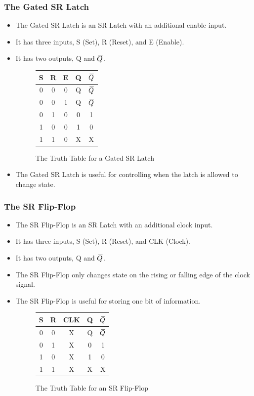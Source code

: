 \documentclass[12pt]{article}
\newcommand{\closure}[2][3]{%
	{}\mkern#1mu\overline{\mkern-#1mu#2}}
\begin{document}
\subsubsection{The Gated SR Latch}
\begin{itemize}
	\item The Gated SR Latch is an SR Latch with an additional enable input.
	\item It has three inputs, S (Set), R (Reset), and E (Enable).
	\item It has two outputs, Q and \(\closure{Q}\).
	      \begin{figure}[H]
		      \centering
		      \begin{tabular}{|c|c|c|c|c|}
			      \hline
			      S & R & E & Q & \(\closure{Q}\) \\
			      \hline
			      0 & 0 & 0 & Q & \(\closure{Q}\) \\
			      0 & 0 & 1 & Q & \(\closure{Q}\) \\
			      0 & 1 & 0 & 0 & 1               \\
			      1 & 0 & 0 & 1 & 0               \\
			      1 & 1 & 0 & X & X               \\
			      \hline
		      \end{tabular}
		      \caption{The Truth Table for a Gated SR Latch}
	      \end{figure}
	\item The Gated SR Latch is useful for controlling when the latch is
	      allowed to change state.
\end{itemize}
\subsubsection{The SR Flip-Flop}
\begin{itemize}
	\item The SR Flip-Flop is an SR Latch with an additional clock input.
	\item It has three inputs, S (Set), R (Reset), and CLK (Clock).
	\item It has two outputs, Q and \(\closure{Q}\).
	\item The SR Flip-Flop only changes state on the rising or falling edge
	      of the clock signal.
	\item The SR Flip-Flop is useful for storing one bit of information.
	      \begin{figure}[H]
		      \centering
		      \begin{tabular}{|c|c|c|c|c|}
			      \hline
			      S & R & CLK & Q & \(\closure{Q}\) \\
			      \hline
			      0 & 0 & X   & Q & \(\closure{Q}\) \\
			      0 & 1 & X   & 0 & 1               \\
			      1 & 0 & X   & 1 & 0               \\
			      1 & 1 & X   & X & X               \\
			      \hline
		      \end{tabular}
		      \caption{The Truth Table for an SR Flip-Flop}
	      \end{figure}
\end{itemize}
\end{document}
